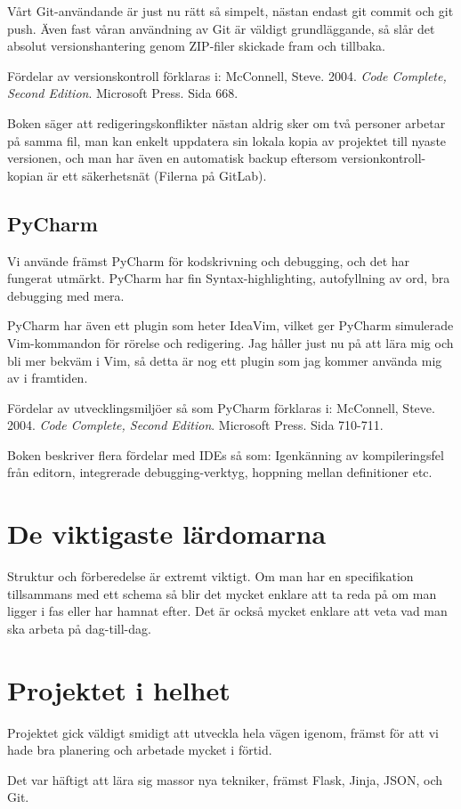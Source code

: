 \documentclass{TDP003mall}
\begin{document}
Vårt Git-användande är just nu rätt så simpelt, nästan endast git commit och git push. Även fast våran användning av Git är väldigt grundläggande, så slår det absolut versionshantering genom ZIP-filer skickade fram och tillbaka.

Fördelar av versionskontroll förklaras i: McConnell, Steve. 2004. \textit{Code Complete, Second Edition}. Microsoft Press. Sida 668.

Boken säger att redigeringskonflikter nästan aldrig sker om två personer arbetar på samma fil, man kan enkelt uppdatera sin lokala kopia av projektet till nyaste versionen, och man har även en automatisk backup eftersom versionkontroll-kopian är ett säkerhetsnät (Filerna på GitLab).

\subsection{PyCharm}
Vi använde främst PyCharm för kodskrivning och debugging, och det har fungerat utmärkt. PyCharm har fin Syntax-highlighting, autofyllning av ord, bra debugging med mera. 

PyCharm har även ett plugin som heter IdeaVim, vilket ger PyCharm simulerade Vim-kommandon för rörelse och redigering. Jag håller just nu på att lära mig och bli mer bekväm i Vim, så detta är nog ett plugin som jag kommer använda mig av i framtiden.

Fördelar av utvecklingsmiljöer så som PyCharm förklaras i: McConnell, Steve. 2004. \textit{Code Complete, Second Edition}. Microsoft Press. Sida 710-711.

Boken beskriver flera fördelar med IDEs så som: Igenkänning av kompileringsfel från editorn, integrerade debugging-verktyg, hoppning mellan definitioner etc.


\section{De viktigaste lärdomarna}
Struktur och förberedelse är extremt viktigt. Om man har en specifikation tillsammans med ett schema så blir det mycket enklare att ta reda på om man ligger i fas eller har hamnat efter. Det är också mycket enklare att veta vad man ska arbeta på dag-till-dag.


\section{Projektet i helhet}
Projektet gick väldigt smidigt att utveckla hela vägen igenom, främst för att vi hade bra planering och arbetade mycket i förtid.

Det var häftigt att lära sig massor nya tekniker, främst Flask, Jinja, JSON, och Git.
\end{document}
